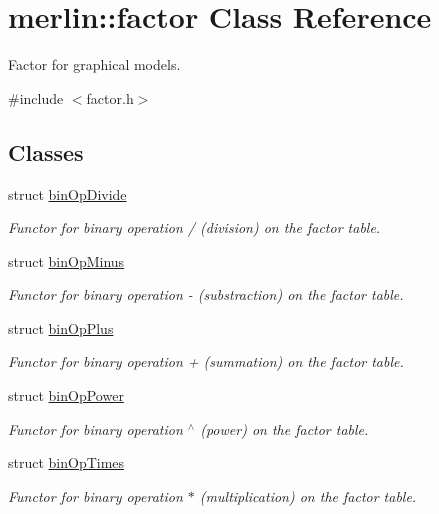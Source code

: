 \hypertarget{classmerlin_1_1factor}{}\section{merlin\+:\+:factor Class Reference}
\label{classmerlin_1_1factor}


Factor for graphical models.  




{\ttfamily \#include $<$factor.\+h$>$}

\subsection*{Classes}
\begin{DoxyCompactItemize}
\item 
struct \hyperlink{structmerlin_1_1factor_1_1binOpDivide}{bin\+Op\+Divide}
\begin{DoxyCompactList}\small\item\em Functor for binary operation / (division) on the factor table. \end{DoxyCompactList}\item 
struct \hyperlink{structmerlin_1_1factor_1_1binOpMinus}{bin\+Op\+Minus}
\begin{DoxyCompactList}\small\item\em Functor for binary operation -\/ (substraction) on the factor table. \end{DoxyCompactList}\item 
struct \hyperlink{structmerlin_1_1factor_1_1binOpPlus}{bin\+Op\+Plus}
\begin{DoxyCompactList}\small\item\em Functor for binary operation + (summation) on the factor table. \end{DoxyCompactList}\item 
struct \hyperlink{structmerlin_1_1factor_1_1binOpPower}{bin\+Op\+Power}
\begin{DoxyCompactList}\small\item\em Functor for binary operation $^\wedge$ (power) on the factor table. \end{DoxyCompactList}\item 
struct \hyperlink{structmerlin_1_1factor_1_1binOpTimes}{bin\+Op\+Times}
\begin{DoxyCompactList}\small\item\em Functor for binary operation $\ast$ (multiplication) on the factor table. \end{DoxyCompactList}\item 

\end{DoxyCompactItemize}
